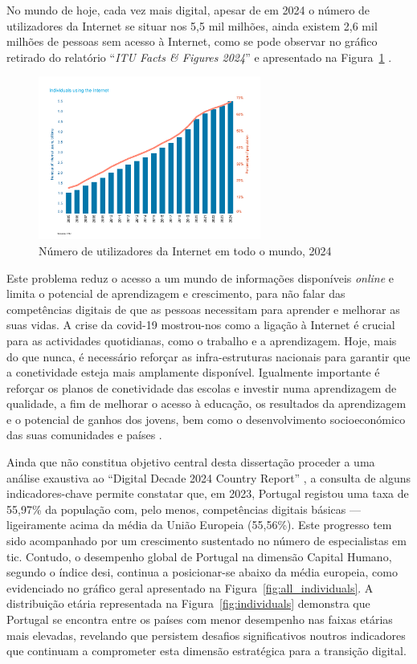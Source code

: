 No mundo de hoje, cada vez mais digital, apesar de em 2024 o número de utilizadores da Internet se situar nos 5,5 mil milhões, ainda existem 2,6 mil milhões de pessoas sem acesso à Internet, como se pode observar no gráfico retirado do relatório ``\textit{ITU Facts \& Figures 2024}'' e apresentado na Figura~\ref{fig:numutilizadoresnet} \cite{broadbandcomission, itu2024facts}.

\begin{figure}[hbtp]
    \centering
    \includegraphics[width=0.65\textwidth]{figures/ITU-InternetUse.png}
    \caption{Número de utilizadores da Internet em todo o mundo, 2024 \cite{itu2024facts}}
    \label{fig:numutilizadoresnet}
\end{figure}
Este problema reduz o acesso a um mundo de informações disponíveis \textit{online} e limita o potencial de aprendizagem e crescimento, para não falar das competências digitais de que as pessoas necessitam para aprender e melhorar as suas vidas.
A crise da \acrshort{covid-19} mostrou-nos como a ligação à Internet é crucial para as actividades quotidianas, como o trabalho e a aprendizagem. Hoje, mais do que nunca, é necessário reforçar as infra-estruturas nacionais para garantir que a conetividade esteja mais amplamente disponível. Igualmente importante é reforçar os planos de conetividade das escolas e investir numa aprendizagem de qualidade, a fim de melhorar o acesso à educação, os resultados da aprendizagem e o potencial de ganhos dos jovens, bem como o desenvolvimento socioeconómico das suas comunidades e países \cite{TheDigitransf}.

Ainda que não constitua objetivo central desta dissertação proceder a uma análise exaustiva ao ``Digital Decade 2024 Country Report'' \cite{DESI2024}, a consulta de alguns indicadores-chave permite constatar que, em 2023, Portugal registou uma taxa de 55,97\% da população com, pelo menos, competências digitais básicas — ligeiramente acima da média da União Europeia (55,56\%). Este progresso tem sido acompanhado por um crescimento sustentado no número de especialistas em \acrshort{tic}.
Contudo, o desempenho global de Portugal na dimensão Capital Humano, segundo o índice \acrshort{desi}, continua a posicionar-se abaixo da média europeia, como evidenciado no gráfico geral apresentado na Figura~\ref{fig:all_individuals}. A distribuição etária representada na Figura~\ref{fig:individuals} demonstra que Portugal se encontra entre os países com menor desempenho nas faixas etárias mais elevadas, revelando que persistem desafios significativos noutros indicadores que continuam a comprometer esta dimensão estratégica para a transição digital.

